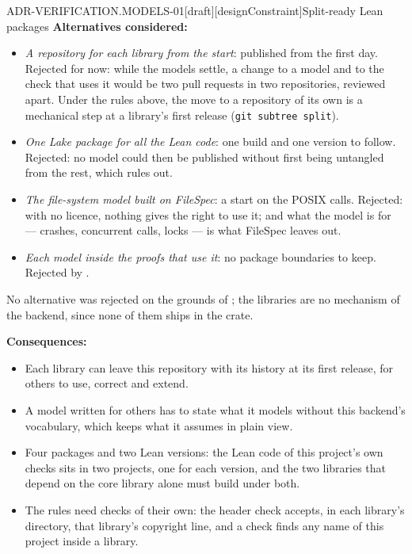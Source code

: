 \begin{requirement}{ADR-VERIFICATION.MODELS-01}[draft][designConstraint]{Split-ready Lean packages}
  \textbf{Alternatives considered:}
  \begin{itemize}
    \item \emph{A repository for each library from the start}: published
      from the first day. Rejected for now: while the models settle, a change
      to a model and to the check that uses it would be two pull requests in
      two repositories, reviewed apart. Under the rules above, the move to a
      repository of its own is a mechanical step at a library's first
      release (\texttt{git subtree split}).
    \item \emph{One Lake package for all the Lean code}: one build and one
      version to follow. Rejected: no model could then be published without
      first being untangled from the rest, which
       rules out.
    \item \emph{The file-system model built on FileSpec}: a start on the
      POSIX calls. Rejected: with no licence, nothing gives the right to use
      it; and what the model is for --- crashes, concurrent calls, locks ---
      is what FileSpec leaves out.
    \item \emph{Each model inside the proofs that use it}: no package
      boundaries to keep. Rejected by .
  \end{itemize}
  No alternative was rejected on the grounds of ;
  the libraries are no mechanism of the backend, since none of them ships in
  the crate.

  \textbf{Consequences:}
  \begin{itemize}
    \item[+] Each library can leave this repository with its history at its
      first release, for others to use, correct and extend.
    \item[+] A model written for others has to state what it models without
      this backend's vocabulary, which keeps what it assumes in plain view.
    \item[--] Four packages and two Lean versions: the Lean code of this
      project's own checks sits in two projects, one for each version, and
      the two libraries that depend on the core library alone must build
      under both.
    \item[--] The rules need checks of their own: the header check accepts,
      in each library's directory, that library's copyright line, and a check
      finds any name of this project inside a library.
  \end{itemize}



\end{requirement}
